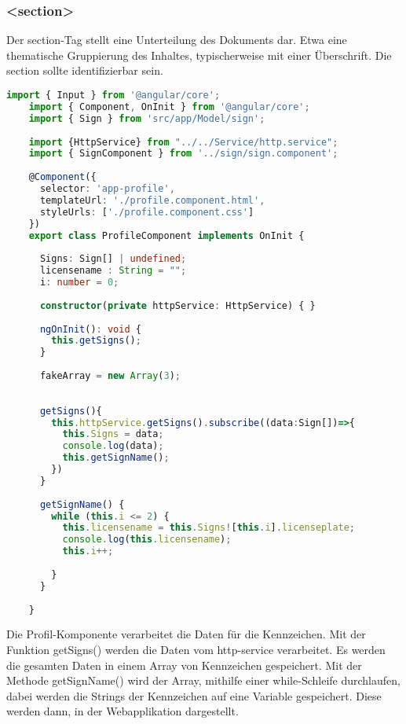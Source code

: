 \subsubsection{<section>}
Der section-Tag stellt eine Unterteilung des Dokuments dar. Etwa eine thematische Gruppierung des Inhaltes, typischerweise mit einer Überschrift. Die section sollte identifizierbar sein.
\cite{SectionTag}

\begin{lstlisting}[language=typeScript, caption=profile.component.ts]
    import { Input } from '@angular/core';
    import { Component, OnInit } from '@angular/core';
    import { Sign } from 'src/app/Model/sign';
    
    import {HttpService} from "../../Service/http.service";
    import { SignComponent } from '../sign/sign.component';
    
    @Component({
      selector: 'app-profile',
      templateUrl: './profile.component.html',
      styleUrls: ['./profile.component.css']
    })
    export class ProfileComponent implements OnInit {
    
      Signs: Sign[] | undefined;
      licensename : String = "";
      i: number = 0;
    
      constructor(private httpService: HttpService) { }
    
      ngOnInit(): void {
        this.getSigns();
      }
    
      fakeArray = new Array(3);
    
    
      getSigns(){
        this.httpService.getSigns().subscribe((data:Sign[])=>{
          this.Signs = data;
          console.log(data);
          this.getSignName();
        })
      }
    
      getSignName() {
        while (this.i <= 2) {
          this.licensename = this.Signs![this.i].licenseplate;
          console.log(this.licensename); 
          this.i++;
    
        }
      }
    
    }    
\end{lstlisting}

Die Profil-Komponente verarbeitet die Daten für die Kennzeichen. Mit der Funktion getSigns() werden die Daten vom http-service verarbeitet. Es werden die gesamten Daten in einem Array von Kennzeichen gespeichert. Mit der Methode getSignName() wird der Array, mithilfe einer while-Schleife durchlaufen, dabei werden die Strings der Kennzeichen auf eine Variable gespeichert. Diese werden dann, in der Webapplikation dargestellt.

